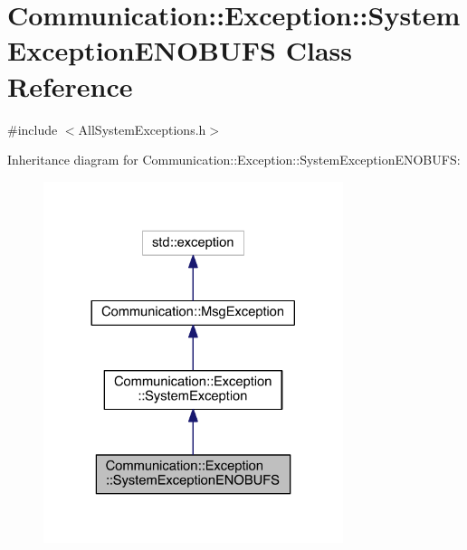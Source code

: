 \hypertarget{class_communication_1_1_exception_1_1_system_exception_e_n_o_b_u_f_s}{}\section{Communication\+:\+:Exception\+:\+:System\+Exception\+E\+N\+O\+B\+U\+F\+S Class Reference}
\label{class_communication_1_1_exception_1_1_system_exception_e_n_o_b_u_f_s}


{\ttfamily \#include $<$All\+System\+Exceptions.\+h$>$}



Inheritance diagram for Communication\+:\+:Exception\+:\+:System\+Exception\+E\+N\+O\+B\+U\+F\+S\+:\nopagebreak
\begin{figure}[H]
\begin{center}
\leavevmode
\includegraphics[width=248pt]{class_communication_1_1_exception_1_1_system_exception_e_n_o_b_u_f_s__inherit__graph}
\end{center}
\end{figure}


